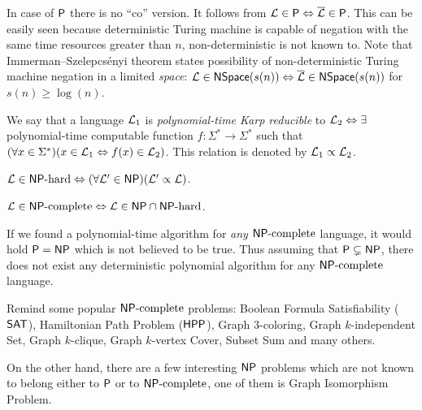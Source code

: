 		\begin{remark}
			In case of $\P$ there is no ``co'' version. It follows from ${\cal L} \in \P \iff \overline{\cal L} \in \P$. This can be easily seen because deterministic Turing machine is capable of negation with the same time resources greater than $n$, non-deterministic is not known to. Note that Immerman--Szelepcsényi theorem states possibility of non-deterministic Turing machine negation in a limited {\em space}: ${\cal L} \in \NSpace(s(n)) \iff \overline{\cal L} \in \NSpace(s(n))$ for $s(n) \geq \log(n)$.
		\end{remark}
		
		\begin{defn}
			We say that a language ${\cal L}_1$ is {\em polynomial-time Karp reducible} to ${\cal L}_2 \iff \exists$ polynomial-time computable function $f:\Sigma^*\rightarrow\Sigma^*$ such that $(\forall x\in\Sigma^*)(x\in{\cal L}_1\iff f(x)\in{\cal L}_2)$. This relation is denoted by ${\cal L}_1\propto{\cal L}_2$.
		\end{defn}
		
		\begin{defn}
			${\cal L}\in\NPH \iff (\forall{\cal L'}\in\NP)({\cal L'}\propto{\cal L})$.
		\end{defn}
		
		\begin{defn}
			${\cal L}\in\NPC\iff{\cal L}\in\NP\cap\NPH$.
		\end{defn}
		
		\begin{note}
			If we found a polynomial-time algorithm for {\em any} $\NPC$ language, it would hold $\P=\NP$ which is not believed to be true. Thus assuming that $\P\subsetneq\NP$, there does not exist any deterministic polynomial algorithm for any $\NPC$ language.
		\end{note}
		
		\begin{example}\label{exm:npc}
			Remind some popular $\NPC$ problems: Boolean Formula Satisfiability ($\sf SAT$), Hamiltonian Path Problem ($\sf HPP$), Graph $3$-coloring, Graph $k$-independent Set, Graph $k$-clique, Graph $k$-vertex Cover, Subset Sum and many others.
			
			On the other hand, there are a few interesting $\NP$ problems which are not known to belong either to $\P$ or to $\NPC$, one of them is Graph Isomorphism Problem.
		\end{example}
		
		

